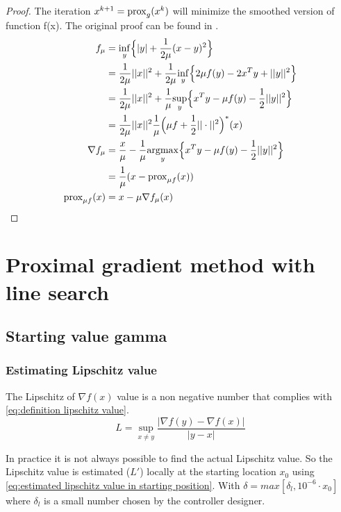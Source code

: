		 \begin{proof}
		 	The iteration $x^{k+1}=\operatorname{prox}_g(x^k)$ will minimize the smoothed version of function f(x). The original proof can be found in \cite{QianYang}. 
		 	\begin{align*}
		 	f_{\mu}
		 	&= \underset{y}{\inf}\Big\{ |y| +\frac{1}{2 \mu}(x-y)^2 \Big\} \\
		 	&=   \frac{1}{2 \mu}||x||^2 + \frac{1}{2\mu} 
		 	\underset{y}{\inf}\Big\{
		 	2 \mu f(y) - 2x^T y + ||y||^2
		 	\Big\} \\
		 	&=  \frac{1}{2 \mu}||x||^2 + \frac{1}{\mu} 
		 	\underset{y}{\sup}\Big\{
		 	x^T y  - \mu f(y) - \frac{1}{2} ||y||^2 \Big \} \\
		 	&= \frac{1}{2\mu }||x||^2 \frac{1}{\mu } \Big( \mu f + \frac{1}{2}||\cdot||^2 \Big)^* (x) \\
		 	\nabla  f_{\mu} 
		 	&= \frac{x}{\mu} - \frac{1}{\mu} \underset{y}{\operatorname{argmax}} 
		 	\Big \{ x^Ty - \mu f(y) - \frac{1}{2}||y||^2 \Big \}\\
		 	& = \frac{1}{\mu}(x - \operatorname{prox}_{\mu f}(x)) \\
		 	\operatorname{prox}_{\mu f}(x)
		 	& = x- \mu \nabla f_{\mu}(x)
		 	\end{align*}
		 	\label{prf:proximal minimiztion alg proof}
		 \end{proof}	 

\section{Proximal gradient method with line search}
	\subsection{Starting value gamma }
		\subsubsection{Estimating Lipschitz value}
			The Lipschitz of $\nabla f(x)$ value is a non negative number that complies with \eqref{eq:definition lipschitz value}.
			\begin{equation}
			L = \underset{x \neq y}{\sup} \frac{|\nabla f(y)-\nabla f(x)|}{|y-x|}
			\label{eq:definition lipschitz value}
			\end{equation}
			
			In practice it is not always possible to find the actual Lipschitz value. So the Lipschitz value is estimated ($L'$) locally at the starting location $x_0$ using \eqref{eq:estimated lipschitz value in starting position}. With $\delta=max[\delta_l,10^{-6} \cdot x_0]$ where $\delta_l$ is a small number chosen by the controller designer.
			
